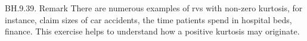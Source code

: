 
\setcounter{theorem}{38}
\begin{exercise} BH.9.39.
Remark There are numerous examples of rvs with  non-zero kurtosis, for instance,  claim sizes of car accidents, the time patients spend in hospital beds, finance. This exercise helps to understand how a positive kurtosis may originate.
\end{exercise}


